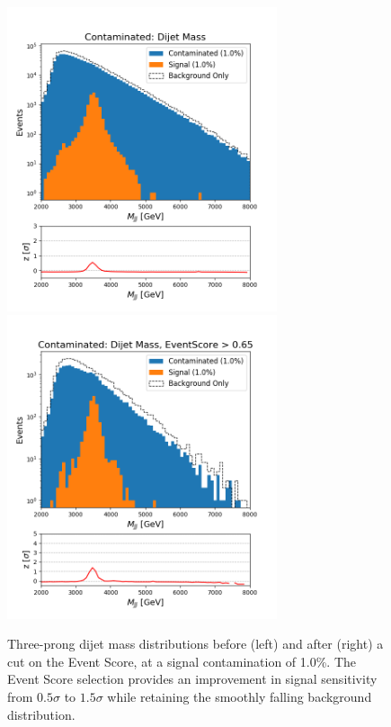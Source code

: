 \documentclass[12pt, a4paper]{article}
\begin{document}
\begin{figure}[H]
	\begin{center}
		\includegraphics[width=225pt]{imgs/bugfix/3Prong_Contaminated_1p0_JJ_Mass_Multi_SaveForPaper_Lead.png}
		\includegraphics[width=225pt]{imgs/bugfix/3Prong_Contaminated_1p0_JJ_Mass_EventScore0p65_Multi_SaveForPaper_Lead.png}
	\end{center}
	\caption{Three-prong dijet mass distributions before (left) and after (right) a cut on the Event Score, at a signal contamination of 1.0\%. The Event Score selection provides an improvement in signal sensitivity from $0.5\sigma$ to $1.5\sigma$ while retaining the smoothly falling background distribution.}
	\label{fig:3p_dijet}
\end{figure}



\end{document}
